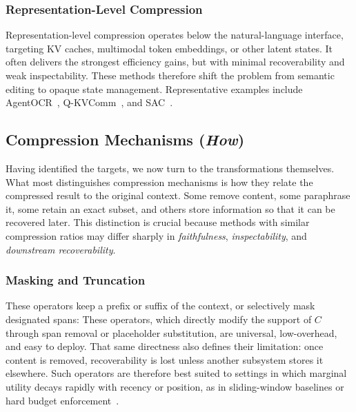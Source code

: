 \subsubsection{Representation-Level Compression}
Representation-level compression operates below the natural-language interface, targeting KV caches, multimodal token embeddings, or other latent states. It often delivers the strongest efficiency gains, but with minimal recoverability and weak inspectability. These methods therefore shift the problem from semantic editing to opaque state management. Representative examples include AgentOCR~\citep{feng2026agentocrreimaginingagenthistory}, Q-KVComm~\citep{kriuk2025qkvcommefficientmultiagentcommunication}, and SAC~\citep{liu2026autoencodingfreecontextcompressionllms}.


\subsection{Compression Mechanisms (\textit{How})}
\label{subsec:compression_mechanism}

Having identified the targets, we now turn to the transformations themselves. What most distinguishes compression mechanisms is how they relate the compressed result to the original context. Some remove content, some paraphrase it, some retain an exact subset, and others store information so that it can be recovered later. This distinction is crucial because methods with similar compression ratios may differ sharply in \emph{faithfulness}, \emph{inspectability}, and \emph{downstream recoverability}.

\subsubsection{Masking and Truncation} 
These operators keep a prefix or suffix of the context, or selectively mask designated spans:
These operators, which directly modify the support of \(C\) through span removal or placeholder substitution, are universal, low-overhead, and easy to deploy. That same directness also defines their limitation: once content is removed, recoverability is lost unless another subsystem stores it elsewhere. Such operators are therefore best suited to settings in which marginal utility decays rapidly with recency or position, as in sliding-window baselines or hard budget enforcement~\citep{wang2025mcpbenchbenchmarkingtoolusingllm}.

